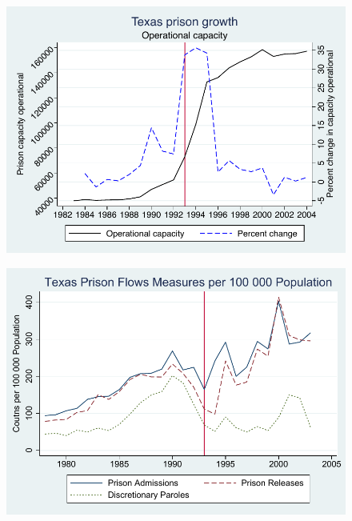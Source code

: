 \documentclass{beamer}
\begin{document}
\begin{frame}[shrink=30,plain]
\begin{figure}
\includegraphics{./lecture_includes/capacity_operational_texas.pdf}
\end{figure}
\end{frame}


\begin{frame}[shrink=30,plain]

\begin{figure}
\includegraphics{./lecture_includes/flow_rate_figure.pdf}
\end{figure}
\end{frame}
\end{document}

